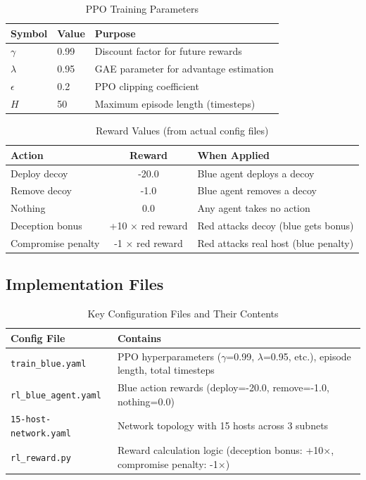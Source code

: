 \documentclass[12pt,oneside]{article}
\begin{document}
\begin{table}[H]
\centering
\caption{PPO Training Parameters}
\label{tab:ppo_symbols}
\small
\begin{tabular}{|l|l|p{5cm}|}
\hline
\rowcolor{cwBorder!30} \textbf{Symbol} & \textbf{Value} & \textbf{Purpose} \\
\hline
$\gamma$ & 0.99 & Discount factor for future rewards \\
$\lambda$ & 0.95 & GAE parameter for advantage estimation \\
$\epsilon$ & 0.2 & PPO clipping coefficient \\
$H$ & 50 & Maximum episode length (timesteps) \\
\hline
\end{tabular}
\end{table}

\begin{table}[H]
\centering
\caption{Reward Values (from actual config files)}
\label{tab:reward_values}
\small
\begin{tabular}{|l|c|l|}
\hline
\rowcolor{cwBorder!30} \textbf{Action} & \textbf{Reward} & \textbf{When Applied} \\
\hline
Deploy decoy & -20.0 & Blue agent deploys a decoy \\
Remove decoy & -1.0 & Blue agent removes a decoy \\
Nothing & 0.0 & Any agent takes no action \\
Deception bonus & +10 × red reward & Red attacks decoy (blue gets bonus) \\
Compromise penalty & -1 × red reward & Red attacks real host (blue penalty) \\
\hline
\end{tabular}
\end{table}

\subsection{Implementation Files}

\begin{table}[H]
\centering
\caption{Key Configuration Files and Their Contents}
\label{tab:config_files}
\small
\begin{tabular}{|l|p{7cm}|}
\hline
\rowcolor{cwBorder!30} \textbf{Config File} & \textbf{Contains} \\
\hline
\texttt{train\_blue.yaml} & PPO hyperparameters ($\gamma$=0.99, $\lambda$=0.95, etc.), episode length, total timesteps \\
\texttt{rl\_blue\_agent.yaml} & Blue action rewards (deploy=-20.0, remove=-1.0, nothing=0.0) \\
\texttt{15-host-network.yaml} & Network topology with 15 hosts across 3 subnets \\
\texttt{rl\_reward.py} & Reward calculation logic (deception bonus: +10×, compromise penalty: -1×) \\
\hline
\end{tabular}
\end{table}
\end{document}
